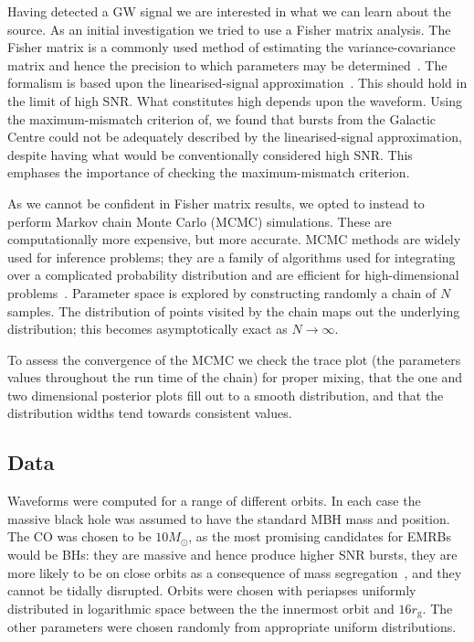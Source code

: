 \documentclass[11pt,twoside]{article}
\begin{document}
Having detected a GW signal we are interested in what we can learn about the source. As an initial investigation we tried to use a Fisher matrix analysis. The Fisher matrix is a commonly used method of estimating the variance-covariance matrix and hence the precision to which parameters may be determined~\citep{Cutler1994}. The formalism is based upon the linearised-signal approximation~\citep{Vallisneri2008}. This should hold in the limit of high SNR. What constitutes high depends upon the waveform. Using the maximum-mismatch criterion of\citet{Vallisneri2008}, we found that bursts from the Galactic Centre could not be adequately described by the linearised-signal approximation, despite having what would be conventionally considered high SNR. This emphases the importance of checking the maximum-mismatch criterion.

As we cannot be confident in Fisher matrix results, we opted to instead to perform Markov chain Monte Carlo (MCMC) simulations. These are computationally more expensive, but more accurate. MCMC methods are widely used for inference problems; they are a family of algorithms used for integrating over a complicated probability distribution and are efficient for high-dimensional problems~\citep[chapter 29]{MacKay2003}. Parameter space is explored by constructing randomly a chain of $N$ samples. The distribution of points visited by the chain maps out the underlying distribution; this becomes asymptotically exact as $N \rightarrow \infty$.

To assess the convergence of the MCMC we check the trace plot (the parameters values throughout the run time of the chain) for proper mixing, that the one and two dimensional posterior plots fill out to a smooth distribution, and that the distribution widths tend towards consistent values.

\subsection{Data}

Waveforms were computed for a range of different orbits. In each case the massive black hole was assumed to have the standard MBH mass and position. The CO was chosen to be $10 M_\odot$, as the most promising candidates for EMRBs would be BHs: they are massive and hence produce higher SNR bursts, they are more likely to be on close orbits as a consequence of mass segregation~\citep{Bahcall1977, Alexander2009}, and they cannot be tidally disrupted. Orbits were chosen with periapses uniformly distributed in logarithmic space between the the innermost orbit and $16 r_\mathrm{g}$. The other parameters were chosen randomly from appropriate uniform distributions. 
\end{document}
